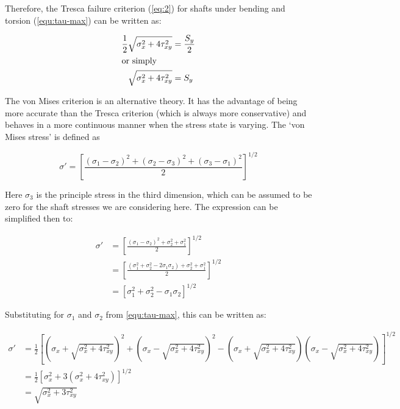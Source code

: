 Therefore, the Tresca failure criterion (\cref{eq:2}) for shafts under bending
and torsion (\cref{equ:tau-max}) can be written as:

\begin{align}
\label{eq:5}
\frac{1}{2} \sqrt{\sigma_x^2+4\tau_{xy}^2} &= \frac{S_y}{2} \\
              \intertext{or simply}
  \label{eq:tresca-failure}
\sqrt{\sigma_x^2+4\tau_{xy}^2} &= S_y
\end{align}

The von Mises criterion is an alternative
theory. It has the advantage of being more accurate than the Tresca criterion
(which is always more conservative) and behaves in a more continuous manner when
the stress state is varying. The `von Mises stress' is defined as

\begin{equation}
\label{eq:7}
\sigma' = \left[ \frac{ 
    \left( \sigma_1 - \sigma_2 \right)^2 +
    \left( \sigma_2 - \sigma_3 \right)^2 +
    \left( \sigma_3 - \sigma_1 \right)^2
  }{2} \right]^{1/2}
\end{equation}

Here $\sigma_3$ is the principle stress in the third dimension, which can be
assumed to be zero for the shaft stresses we are considering here. The
expression can be simplified then to:

\begin{align}
\label{eq:9}
  \sigma' &= \left[ \frac{ 
  \left( \sigma_1 - \sigma_2 \right)^2 + \sigma_2^2 + \sigma_1^2
  }{2} \right]^{1/2} \\
&= \left[ \frac{\left( \sigma_1^2 + \sigma_2^2 - 2 \sigma_1\sigma_2 \right) + \sigma_2^2 + \sigma_1^2}{2} \right]^{1/2} \\
          &= \left[ \sigma_1^2 + \sigma_2^2 - \sigma_1\sigma_2 \right]^{1/2} 
\end{align}

Substituting for $\sigma_1$ and $\sigma_2$ from \cref{equ:tau-max}, this can be written
as:

\begin{align}
\sigma' &= \frac{1}{2} \left[
          \left( \sigma_x + \sqrt{\sigma_x^2+4\tau_{xy}^2} \right)^2 +
          \left( \sigma_x - \sqrt{\sigma_x^2+4\tau_{xy}^2} \right)^2 -
          \left( \sigma_x + \sqrt{\sigma_x^2+4\tau_{xy}^2} \right)
          \left( \sigma_x - \sqrt{\sigma_x^2+4\tau_{xy}^2} \right)
          \right]^{1/2} \\
&= \frac{1}{2} \left[\sigma_x^2 + 3\left( \sigma_x^2+4\tau_{xy}^2 \right) \right]^{1/2} \\
  &= \sqrt{\sigma_x^2 + 3\tau_{xy}^2}
  \label{eq:8}
\end{align}

